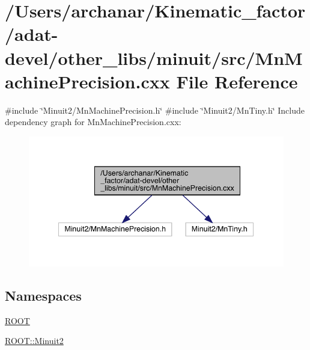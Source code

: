 \hypertarget{adat-devel_2other__libs_2minuit_2src_2MnMachinePrecision_8cxx}{}\section{/\+Users/archanar/\+Kinematic\+\_\+factor/adat-\/devel/other\+\_\+libs/minuit/src/\+Mn\+Machine\+Precision.cxx File Reference}
\label{adat-devel_2other__libs_2minuit_2src_2MnMachinePrecision_8cxx}
{\ttfamily \#include \char`\"{}Minuit2/\+Mn\+Machine\+Precision.\+h\char`\"{}}\newline
{\ttfamily \#include \char`\"{}Minuit2/\+Mn\+Tiny.\+h\char`\"{}}\newline
Include dependency graph for Mn\+Machine\+Precision.\+cxx\+:
\nopagebreak
\begin{figure}[H]
\begin{center}
\leavevmode
\includegraphics[width=342pt]{df/d6c/adat-devel_2other__libs_2minuit_2src_2MnMachinePrecision_8cxx__incl}
\end{center}
\end{figure}
\subsection*{Namespaces}
\begin{DoxyCompactItemize}
\item 
 \mbox{\hyperlink{namespaceROOT}{R\+O\+OT}}
\item 
 \mbox{\hyperlink{namespaceROOT_1_1Minuit2}{R\+O\+O\+T\+::\+Minuit2}}
\end{DoxyCompactItemize}
